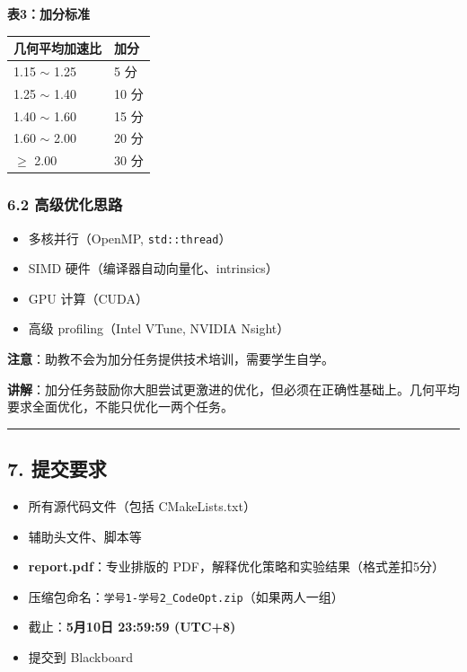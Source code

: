\documentclass[11pt, a4paper]{article}
\begin{document}
\begin{aibox}
\textbf{表3：加分标准}

\vspace{0.5em}
\begin{tabularx}{0.6\textwidth}{@{} X l @{}}
\toprule
几何平均加速比 & 加分 \\
\midrule
1.15 $\sim$ 1.25 & 5 分 \\
1.25 $\sim$ 1.40 & 10 分 \\
1.40 $\sim$ 1.60 & 15 分 \\
1.60 $\sim$ 2.00 & 20 分 \\
$\ge$ 2.00 & 30 分 \\
\bottomrule
\end{tabularx}
\vspace{0.5em}

\subsubsection*{6.2 高级优化思路}
\begin{itemize}
    \item 多核并行（OpenMP, \texttt{std::thread}）
    \item SIMD 硬件（编译器自动向量化、intrinsics）
    \item GPU 计算（CUDA）
    \item 高级 profiling（Intel VTune, NVIDIA Nsight）
\end{itemize}

\textbf{注意}：助教不会为加分任务提供技术培训，需要学生自学。

\textbf{讲解}：加分任务鼓励你大胆尝试更激进的优化，但必须在正确性基础上。几何平均要求全面优化，不能只优化一两个任务。

\begin{center}\rule{\textwidth}{0.4pt}\end{center}

\subsection*{7. 提交要求}

\begin{itemize}
    \item 所有源代码文件（包括 CMakeLists.txt）
    \item 辅助头文件、脚本等
    \item \textbf{report.pdf}：专业排版的 PDF，解释优化策略和实验结果（格式差扣5分）
    \item 压缩包命名：\texttt{学号1-学号2\_CodeOpt.zip}（如果两人一组）
    \item 截止：\textbf{5月10日 23:59:59 (UTC+8)}
    \item 提交到 Blackboard
\end{itemize}


\end{aibox}
\end{document}
